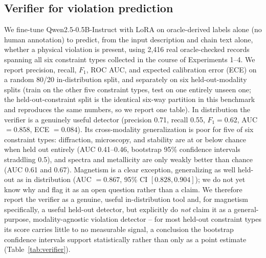 \documentclass[pdflatex,sn-nature]{sn-jnl}
\begin{document}
\subsection*{Verifier for violation prediction}
We fine-tune Qwen2.5-0.5B-Instruct with LoRA on oracle-derived labels alone (no human
annotation) to predict, from the input description and chain text alone, whether a
physical violation is present, using 2{,}416 real oracle-checked records spanning all
six constraint types collected in the course of Experiments 1--4. We report precision,
recall, $F_1$, ROC AUC, and expected calibration error (ECE) on a random 80/20
in-distribution split, and separately on six held-out-modality splits (train on the
other five constraint types, test on one entirely unseen one; the held-out-constraint
split is the identical six-way partition in this benchmark and reproduces the same
numbers, so we report one table). In distribution the verifier is a genuinely useful
detector (precision 0.71, recall 0.55, $F_1=0.62$, AUC $=0.858$, ECE $=0.084$). Its
cross-modality generalization is poor for five of six constraint types: diffraction,
microscopy, and stability are at or below chance when held out entirely (AUC
0.41--0.46, bootstrap 95\% confidence intervals straddling 0.5), and spectra and
metallicity are only weakly better than chance (AUC 0.61 and 0.67). Magnetism is a
clear exception, generalizing as well held-out as in distribution (AUC $=0.867$,
95\% CI $[0.828,0.904]$); we do not yet know why and flag it as an open question
rather than a claim. We therefore report the verifier as a genuine, useful
in-distribution tool and, for magnetism specifically, a useful held-out detector, but
explicitly do \emph{not} claim it as a general-purpose, modality-agnostic violation
detector -- for most held-out constraint types its score carries little to no
measurable signal, a conclusion the bootstrap confidence intervals support
statistically rather than only as a point estimate (Table~\ref{tab:verifier}).
\end{document}

